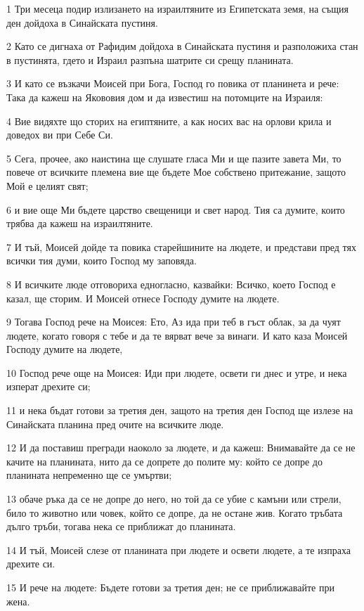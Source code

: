 \par 1 Три месеца подир излизането на израилтяните из Египетската земя, на същия ден дойдоха в Синайската пустиня.
\par 2 Като се дигнаха от Рафидим дойдоха в Синайската пустиня и разположиха стан в пустинята, гдето и Израил разпъна шатрите си срещу планината.
\par 3 И като се възкачи Моисей при Бога, Господ го повика от планинета и рече: Така да кажеш на Якововия дом и да известиш на потомците на Израиля:
\par 4 Вие видяхте що сторих на египтяните, а как носих вас на орлови крила и доведох ви при Себе Си.
\par 5 Сега, прочее, ако наистина ще слушате гласа Ми и ще пазите завета Ми, то повече от всичките племена вие ще бъдете Мое собствено притежание, защото Мой е целият свят;
\par 6 и вие още Ми бъдете царство свещеници и свет народ. Тия са думите, които трябва да кажеш на израилтяните.
\par 7 И тъй, Моисей дойде та повика старейшините на людете, и представи пред тях всички тия думи, които Господ му заповяда.
\par 8 И всичките люде отговориха едногласно, казвайки: Всичко, което Господ е казал, ще сторим. И Моисей отнесе Господу думите на людете.
\par 9 Тогава Господ рече на Моисея: Ето, Аз ида при теб в гъст облак, за да чуят людете, когато говоря с тебе и да те вярват вече за винаги. И като каза Моисей Господу думите на людете,
\par 10 Господ рече още на Моисея: Иди при людете, освети ги днес и утре, и нека изперат дрехите си;
\par 11 и нека бъдат готови за третия ден, защото на третия ден Господ ще излезе на Синайската планина пред очите на всичките люде.
\par 12 И да поставиш прегради наоколо за людете, и да кажеш: Внимавайте да се не качите на планината, нито да се допрете до полите му: който се допре до планината непременно ще се умъртви;
\par 13 обаче ръка да се не допре до него, но той да се убие с камъни или стрели, било то животно или човек, който се допре, да не остане жив. Когато тръбата дълго тръби, тогава нека се приближат до планината.
\par 14 И тъй, Моисей слезе от планината при людете и освети людете, а те изпраха дрехите си.
\par 15 И рече на людете: Бъдете готови за третия ден; не се приближавайте при жена.

